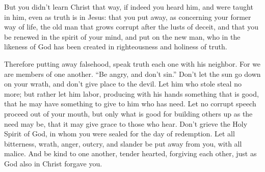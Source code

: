 {But you didn’t learn Christ that way,
if indeed you heard him, and were taught in him, even as truth is in Jesus:
that you put away, as concerning your former way of life, the old man that grows corrupt after the lusts of deceit,
and that you be renewed in the spirit of your mind,
and put on the new man, who in the likeness of God has been created in righteousness and holiness of truth.
\par }{\PP {}Therefore putting away falsehood, speak truth each one with his neighbor. For we are members of one another.
“Be angry, and don’t sin.” Don’t let the sun go down on your wrath,
and don’t give place to the devil.
Let him who stole steal no more; but rather let him labor, producing with his hands something that is good, that he may have something to give to him who has need.
Let no corrupt speech proceed out of your mouth, but only what is good for building others up as the need may be, that it may give grace to those who hear.
Don’t grieve the Holy Spirit of God, in whom you were sealed for the day of redemption.
Let all bitterness, wrath, anger, outcry, and slander be put away from you, with all malice.
And be kind to one another, tender hearted, forgiving each other, just as God also in Christ forgave you.

}
